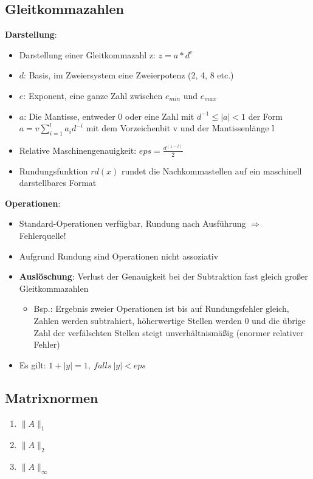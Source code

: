 \documentclass[10pt,a4paper]{article}
\newcommand{\norm}[1]{\lVert#1\rVert}
\begin{document}
	\subsection{Gleitkommazahlen}
	\textbf{Darstellung}:
	\begin{itemize}
		\item Darstellung einer Gleitkommazahl z: $z = a * d^e$
		\item $d$: Basis, im Zweiersystem eine Zweierpotenz (2, 4, 8 etc.)
		\item $e$: Exponent, eine ganze Zahl zwischen $e_{min}$ und $e_{max}$
		\item $a$: Die Mantisse, entweder 0 oder eine Zahl mit $d^{-1} \leq |a| < 1$ der Form $a = v \sum_{i = 1}^{l} a_id^{-i}$ mit dem Vorzeichenbit v und der Mantissenlänge l
		\item Relative Maschinengenauigkeit: $eps = \frac{d^{(1-l)}}{2}$
		\item Rundungsfunktion $rd(x)$ rundet die Nachkommastellen auf ein maschinell darstellbares Format
	\end{itemize}
	\textbf{Operationen}:
	\begin{itemize}
		\item Standard-Operationen verfügbar, Rundung nach Ausführung $\Rightarrow$ Fehlerquelle!
		\item Aufgrund Rundung sind Operationen nicht assoziativ
		\item \textbf{Auslöschung}: Verlust der Genauigkeit bei der Subtraktion fast gleich großer Gleitkommazahlen
		\begin{itemize}
			\item Bsp.: Ergebnis zweier Operationen ist bis auf Rundungsfehler gleich, Zahlen werden subtrahiert, höherwertige Stellen werden 0 und die übrige Zahl der verfälschten Stellen steigt unverhältnismäßig (enormer relativer Fehler)
		\end{itemize}
		\item Es gilt: $1 + |y| = 1,\ falls\ |y| < eps$
	\end{itemize}
	
	
	\subsection{Matrixnormen}
	\begin{enumerate}
		\item{ $\norm{A}_1$}
		\item{ $\norm{A}_2$}
		\item{ $\norm{A}_\infty$}
	\end{enumerate}
	
\end{document}

